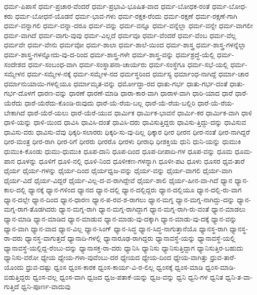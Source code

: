 {ಧರ್ಮ-ಪಿಪಾಸೆ
ಧರ್ಮ-ಪ್ರಚಾರ-ವೆಂದರೆ
ಧರ್ಮ-ಪ್ರಭಾವಿ-ಭೂಷಿತ-ವಾದ
ಧರ್ಮ-ಬೋಧಕ-ರಂತೆ
ಧರ್ಮ-ಬೋಧ-ಕರು
ಧರ್ಮ-ಬೋಧನೆ-ಯೊಡನೆ
ಧರ್ಮ-ಭಾವ-ಗಳು
ಧರ್ಮ-ರಕ್ಷಕ-ರೆಂದು
ಧರ್ಮ-ರಕ್ಷಣೆ
ಧರ್ಮ-ರಕ್ಷಣೆ-ಗಾಗಿ
ಧರ್ಮ-ವನ್ನಾಗಲಿ
ಧರ್ಮ-ವನ್ನಾ-ದರೂ
ಧರ್ಮ-ವನ್ನು
ಧರ್ಮ-ವನ್ನೂ
ಧರ್ಮ-ವನ್ನೆಲ್ಲಾ
ಧರ್ಮ-ವನ್ನೇ
ಧರ್ಮ-ವಾಗಲೀ
ಧರ್ಮ-ವಾಗಿದೆ
ಧರ್ಮ-ವಾಗು-ವುವು
ಧರ್ಮ-ವಿಲ್ಲದೆ
ಧರ್ಮವೂ
ಧರ್ಮ-ವೆಂದರೆ
ಧರ್ಮ-ವೆಂಬ
ಧರ್ಮ-ವೆಲ್ಲ
ಧರ್ಮವೇ
ಧರ್ಮ-ವೇನು
ಧರ್ಮವೋ
ಧರ್ಮ-ಶಾಲಾ
ಧರ್ಮ-ಶಾಲೆ-ಯಿಂದ
ಧರ್ಮ-ಶಾಸ್ತ್ರ
ಧರ್ಮ-ಶಾಸ್ತ್ರ-ಗಳನ್ನೆಲ್ಲಾ
ಧರ್ಮ-ಶಾಸ್ತ್ರ-ಗಳನ್ನೋದು-ವು-ದ-ರಿಂದ
ಧರ್ಮ-ಶಾಸ್ತ್ರ-ಗಳೇ
ಧರ್ಮ-ಶಾಸ್ತ್ರ-ವನ್ನು
ಧರ್ಮಶ್ರದ್ಧೆ-ಯೆಲ್ಲಿ
ಧರ್ಮ-ಸಂದೇಶದ
ಧರ್ಮ-ಸಂಬಂಧ-ವಾಗಿ
ಧರ್ಮ-ಸಂಸ್ಥಾಪನಾ-ಚಾರ್ಯರು
ಧರ್ಮ-ಸಂಸ್ಥೆಗೂ
ಧರ್ಮ-ಸಭೆ-ಯಲ್ಲಿ
ಧರ್ಮ-ಸಮ್ಮೇಳನ
ಧರ್ಮ-ಸಮ್ಮೇಳ-ನಕ್ಕೆ
ಧರ್ಮ-ಸಮ್ಮೇಳ-ನದ
ಧರ್ಮಸ್ಥರಿಂದ
ಧರ್ಮಸ್ಯ
ಧರ್ಮಾಂಧ-ನಾಗಿದ್ದೆ
ಧರ್ಮಾ-ಚಾರ
ಧರ್ಮಾನುಯಾಯಿ-ಗಳಲ್ಲಿಯೂ
ಧರ್ಮಾಮೃತ-ವನ್ನು
ಧರ್ಮೋದ್ಧಾ-ರದ
ಧಾತು-ಗರ್ಭ
ಧಾತು-ಗರ್ಭ-ದಂತೆ
ಧಾತು-ಗರ್ಭ-ದೊಳಗೆ
ಧಾರಣ-ವನ್ನು
ಧಾರಣೆ
ಧಾರಣೆ-ಮಾಡಿ
ಧಾರಾ-ಕಾರ-ವಾಗಿ
ಧಾರಾಳ-ವಾಗಿ
ಧಾರಿ-ಯಾದ
ಧಾರೆ
ಧಾರೆ-ಯೆರೆದು
ಧಾರೆ-ಯೆರೆದು-ಕೊಂಡಿ-ರುವುದು
ಧಾರೆ-ಯೆ-ರೆಯ-ಬಲ್ಲ
ಧಾರೆ-ಯೆ-ರೆಯ-ಬಲ್ಲಿರಿ
ಧಾರೆ-ಯೆ-ರೆಯ-ಬೇಕಾಗಿದೆ
ಧಾರೆ-ಯೆರೆ-ಯಲು
ಧಾರೆ-ಯೆರೆ-ಯುವ
ಧಾರ್ಮಿಕ
ಧಾರ್ಮಿಕ-ಭಾವನೆ
ಧಾರ್ಮಿ-ಕರ
ಧಾರ್ಮಿಕ-ವಾಗಿ
ಧಾಳಿ
ಧಾಳಿ-ಯನ್ನು
ಧಾಳಿ-ಯಿಂದ
ಧಾವಿಸಿ
ಧಾವಿಸಿ-ದಂತೆ
ಧಾವಿಸಿ-ದರು
ಧಾವಿಸುತ್ತಿದ್ದರು
ಧಾವಿಸು-ತ್ತಿದ್ದು-ದನ್ನು
ಧಾವಿಸುವ
ಧಾವಿಸು-ವರು
ಧಾವಿಸು-ವೆವು
ಧಿಕ್ಕರಿ-ಸಲಾರರು
ಧಿಕ್ಕರಿ-ಸು-ವು-ದಿಲ್ಲ
ಧಿಕ್ಕಾರ
ಧೀರ
ಧೀರನ
ಧೀರ-ನಂತೆ
ಧೀರ-ನಾಗಿದ್ದರೆ
ಧೀರ-ಮಂತ್ರ
ಧೀರ-ರಾಗಿ
ಧೀರ-ರಿಗೆ
ಧೀರರು
ಧೀರರೊ
ಧೀರಳು
ಧೀರಾಧಿ
ಧೀಶಕ್ತಿಯ
ಧುನಿ
ಧುನಿ-ಯನ್ನು
ಧುಮುಕಿ
ಧುಮುಕಿ-ಕೊಂಡು
ಧುಮು-ಧುಮುಕಿ
ಧೂಪ-ದಾನಿ
ಧೂಪ-ದಿಂದ
ಧೂಪ-ದೀಪಾದಿ-ಗಳ
ಧೂಪ-ವನ್ನು
ಧೂಮ
ಧೂಮ-ಪಾನ
ಧೂಳನ್ನು
ಧೂಳಿಗೆ
ಧೂಳಿ-ನಲ್ಲಿ
ಧೂಳಿ-ನಿಂದ
ಧೂಳೀಕಣ-ಗಳನ್ನಾಗಿ
ಧೂಳೀ-ಪಟ
ಧೂಳು
ಧೂಸರ
ಧೃವ-ತಾರೆ
ಧೈರ್ಯ
ಧೈರ್ಯ-ಗಳನ್ನು
ಧೈರ್ಯ-ದಿಂದ
ಧೈರ್ಯಧ್ವಜ-ವನ್ನು
ಧೈರ್ಯ-ವನ್ನು
ಧೈರ್ಯ-ವಾಗಲಿ
ಧೈರ್ಯ-ವಾಗಿ
ಧೈರ್ಯ-ವಿದೆ
ಧೈರ್ಯ-ವಿದ್ದರೆ
ಧೈರ್ಯ-ವಿಲ್ಲ-ದ-ವ-ರಾಗಿದ್ದೇವೆ
ಧೈರ್ಯ-ಶಾಲಿ
ಧೈರ್ಯ-ಹೀನ-ವಾ-ಗಿದೆ
ಧ್ಯಾನ
ಧ್ಯಾನ-ಕಾಲ-ದಲ್ಲಿ
ಧ್ಯಾನಕ್ಕೆ
ಧ್ಯಾನ-ಗಳಿಂದ
ಧ್ಯಾನದ
ಧ್ಯಾನ-ದಲ್ಲಿ
ಧ್ಯಾನ-ದಲ್ಲಿದ್ದರು
ಧ್ಯಾನ-ದಲ್ಲಿಯೂ
ಧ್ಯಾನ-ದಲ್ಲಿ-ರು-ವಾಗ
ಧ್ಯಾನ-ದಲ್ಲೇ
ಧ್ಯಾನ-ದಿಂದ
ಧ್ಯಾನ-ಧಾರಣ
ಧ್ಯಾನ-ಪ-ರವ-ಶ-ರಾಗಲು
ಧ್ಯಾನ-ಮಗ್ನ
ಧ್ಯಾನ-ಮಗ್ನ-ನಾಗಿದ್ದು-ದನ್ನು
ಧ್ಯಾನ-ಮಗ್ನ-ರಾಗ-ತೊಡಗಿದರು
ಧ್ಯಾನ-ಮಗ್ನ-ರಾಗಿ
ಧ್ಯಾನ-ಮಗ್ನ-ರಾಗಿದ್ದಾಗ
ಧ್ಯಾನ-ಮಗ್ನ-ರಾಗಿ-ರು-ವಂತೆ
ಧ್ಯಾನ-ಮಾಡಲು
ಧ್ಯಾನ-ಮಾಡಿ
ಧ್ಯಾನ-ಮಾಡಿದ
ಧ್ಯಾನ-ಮಾಡುವ
ಧ್ಯಾನ-ಮಾಡು-ವು-ದಕ್ಕಾಗಿ
ಧ್ಯಾನ-ಮಾಡು-ವು-ದಕ್ಕೆ
ಧ್ಯಾನ-ವನ್ನು
ಧ್ಯಾನ-ವಾಗಿ
ಧ್ಯಾನ-ವಾದ
ಧ್ಯಾನ-ವಿಲ್ಲ
ಧ್ಯಾನ-ಸಿಂಗ್
ಧ್ಯಾನ-ಸಿದ್ಧ
ಧ್ಯಾನ-ಸಿದ್ಧ-ನಾಗುತ್ತಾನೆಯೊ
ಧ್ಯಾನಸ್ಥ-ರಾಗಿ
ಧ್ಯಾನಸ್ಥ-ರಾ-ದರು
ಧ್ಯಾನಸ್ಥ-ವಾಗುತ್ತದೆ
ಧ್ಯಾನಾದಿ-ಗಳಲ್ಲಿ
ಧ್ಯಾನಾರೂಢ-ರಾಗಿದ್ದರು
ಧ್ಯಾನಾವಸ್ಥೆ-ಯನ್ನು
ಧ್ಯಾನಾವಸ್ಥೆ-ಯಲ್ಲಿ
ಧ್ಯಾನಾವಸ್ಥೆ-ಯಲ್ಲಿದ್ದ-ರೆಂಬು-ದನ್ನು
ಧ್ಯಾನಾಸಕ್ತ-ರಾ-ದರು
ಧ್ಯಾನಿಸಿ
ಧ್ಯಾನಿಸು
ಧ್ಯಾನಿಸುತ್ತಿದ್ದಾಗ
ಧ್ಯಾನಿಸುತ್ತಿರ-ಬಹುದು
ಧ್ಯಾನಿಸು-ವರೋ
ಧ್ಯೇಯ
ಧ್ಯೇಯ-ಗಳಾ-ವುವೆಂಬು-ದರ
ಧ್ಯೇಯದ
ಧ್ಯೇಯ-ದಿಂದ
ಧ್ಯೇಯ-ವಾಗಿತ್ತು
ಧ್ರುವ-ತಾರೆ-ಯೊಂದು
ಧ್ರುವ-ದಷ್ಟು
ಧ್ವಂಸ
ಧ್ವಂಸ-ಕಾರಕ
ಧ್ವಂಸ-ಕಾರ್ಯ-ವಿ-ರ-ಲಿಲ್ಲ
ಧ್ವಂಸಕ್ಕೆ
ಧ್ವಂಸ-ಮಾಡಿ
ಧ್ವಂಸ-ಮಾಡಿ-ಬಿಡುತ್ತಿದ್ದರು
ಧ್ವಂಸ-ವಲ್ಲ
ಧ್ವಂಸ-ವಾಗಿ
ಧ್ವಜದ
ಧ್ವಜ-ಪತಾಕೆ-ಯನ್ನು
ಧ್ವಜ-ವನ್ನು
ಧ್ವನಿ
ಧ್ವನಿ-ಗಳ
ಧ್ವನಿತ
ಧ್ವನಿ-ತ-ವಾ-ಗುತ್ತಿದೆ
ಧ್ವನಿ-ಪೂರ್ಣ-ವಾದುವು
}
